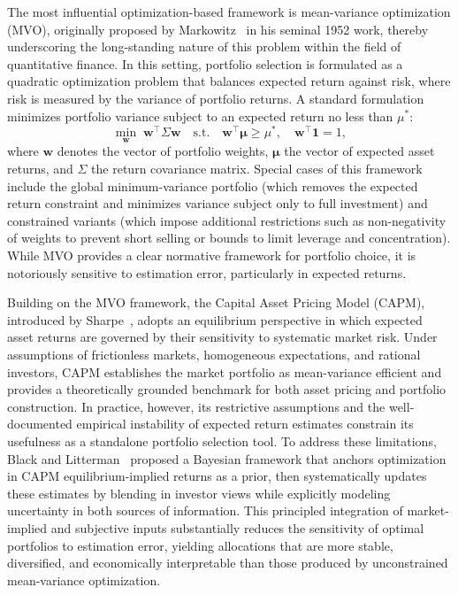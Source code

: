 The most influential optimization-based framework is mean-variance optimization (MVO), originally proposed by Markowitz~\cite{Markowitz1952} in his seminal 1952 work, thereby underscoring the long-standing nature of this problem within the field of quantitative finance. In this setting, portfolio selection is formulated as a quadratic optimization problem that balances expected return against risk, where risk is measured by the variance of portfolio returns. A standard formulation minimizes portfolio variance subject to an expected return no less than \(\mu^*\):
\[
\min_{\mathbf{w}} \; \mathbf{w}^\top \Sigma \mathbf{w}
\quad \text{s.t.} \quad
\mathbf{w}^\top \boldsymbol{\mu} \geq \mu^*, 
\quad \mathbf{w}^\top \mathbf{1} = 1,
\]
where $\mathbf{w}$ denotes the vector of portfolio weights, $\boldsymbol{\mu}$ the vector of expected asset returns, and $\Sigma$ the return covariance matrix. Special cases of this framework include the global minimum-variance portfolio (which removes the expected return constraint and minimizes variance subject only to full investment) and constrained variants (which impose additional restrictions such as non-negativity of weights to prevent short selling or bounds to limit leverage and concentration). While MVO provides a clear normative framework for portfolio choice, it is notoriously sensitive to estimation error, particularly in expected returns.

Building on the MVO framework, the Capital Asset Pricing Model (CAPM), introduced by Sharpe~\cite{Sharpe1964}, adopts an equilibrium perspective in which expected asset returns are governed by their sensitivity to systematic market risk. Under assumptions of frictionless markets, homogeneous expectations, and rational investors, CAPM establishes the market portfolio as mean-variance efficient and provides a theoretically grounded benchmark for both asset pricing and portfolio construction. In practice, however, its restrictive assumptions and the well-documented empirical instability of expected return estimates constrain its usefulness as a standalone portfolio selection tool. To address these limitations, Black and Litterman~\cite{BlackLitterman1992} proposed a Bayesian framework that anchors optimization in CAPM equilibrium-implied returns as a prior, then systematically updates these estimates by blending in investor views while explicitly modeling uncertainty in both sources of information. This principled integration of market-implied and subjective inputs substantially reduces the sensitivity of optimal portfolios to estimation error, yielding allocations that are more stable, diversified, and economically interpretable than those produced by unconstrained mean-variance optimization.

